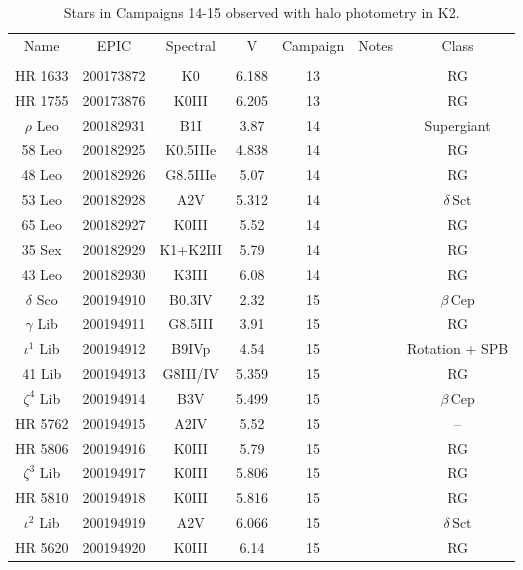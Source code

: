 \begin{table*}
\caption{Stars in Campaigns 14-15 observed with halo photometry in K2.\label{table_4}}
\begin{tabular}{ccccccc}
\hline \hline
Name & EPIC & Spectral & V & Campaign & Notes & Class \\
 &  &  &  &  &  &  \\
\hline
HR 1633 & 200173872 & K0 & 6.188 & 13 &  & RG \\
HR 1755 & 200173876 & K0III & 6.205 & 13 &  & RG \\
$\rho$ Leo & 200182931 & B1I & 3.87 & 14 & \tablenotemark{e} & Supergiant \\
58 Leo & 200182925 & K0.5IIIe & 4.838 & 14 &  & RG \\
48 Leo & 200182926 & G8.5IIIe & 5.07 & 14 &  & RG \\
53 Leo & 200182928 & A2V & 5.312 & 14 &  & $\delta\,\text{Sct}$ \\
65 Leo & 200182927 & K0III & 5.52 & 14 &  & RG \\
35 Sex & 200182929 & K1+K2III & 5.79 & 14 &  & RG \\
43 Leo & 200182930 & K3III & 6.08 & 14 &  & RG \\
$\delta$ Sco & 200194910 & B0.3IV & 2.32 & 15 &  & $\beta$\,Cep \\
$\gamma$ Lib & 200194911 & G8.5III & 3.91 & 15 &  & RG \\
$\iota^{1}$ Lib & 200194912 & B9IVp & 4.54 & 15 & \tablenotemark{b} & Rotation + SPB \\
41 Lib & 200194913 & G8III/IV & 5.359 & 15 &  & RG \\
$\zeta^{4}$ Lib & 200194914 & B3V & 5.499 & 15 &  & $\beta$\,Cep \\
HR 5762 & 200194915 & A2IV & 5.52 & 15 &  & -- \\
HR 5806 & 200194916 & K0III & 5.79 & 15 &  & RG \\
$\zeta^{3}$ Lib & 200194917 & K0III & 5.806 & 15 &  & RG \\
HR 5810 & 200194918 & K0III & 5.816 & 15 &  & RG \\
$\iota^{2}$ Lib & 200194919 & A2V & 6.066 & 15 & \tablenotemark{b} & $\delta\,\text{Sct}$ \\
HR 5620 & 200194920 & K0III & 6.14 & 15 &  & RG \\
\hline
\end{tabular}
\end{table*}
